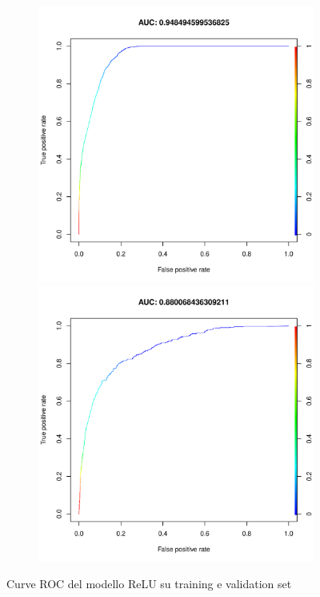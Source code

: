 \begin{figure}[H]
	\centering
	\begin{subfigure}[t]{1\textwidth}
		\begin{minipage}[t]{0.475\textwidth}
			\includegraphics[width=\textwidth]{images/ml/mlp/holdout/relu-training}
		\end{minipage}
		\hfill
		\begin{minipage}[t]{0.475\textwidth}
			\includegraphics[width=\textwidth]{images/ml/mlp/holdout/relu-test}
		\end{minipage}
	\end{subfigure}
	\caption{Curve ROC del modello ReLU su training e validation set}
	\label{fig:mlp_h_r_roc}
\end{figure}

